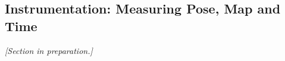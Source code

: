 \subsection{Instrumentation: Measuring Pose, Map and Time}
\label{sec:instrumentation}

\emph{[Section in preparation.]}
